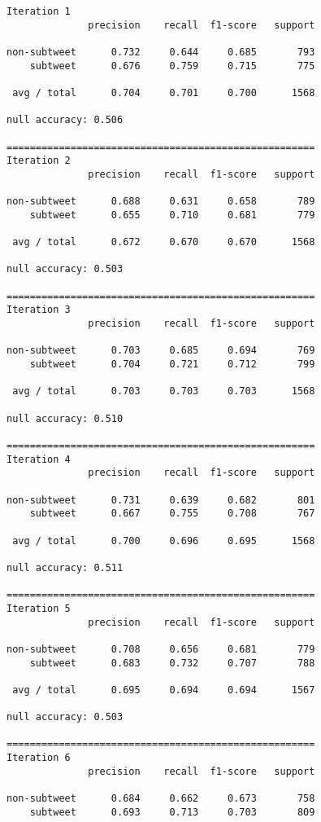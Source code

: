 \documentclass[11pt]{article}
\begin{document}
    \begin{Verbatim}[commandchars=\\\{\}]
Iteration 1
              precision    recall  f1-score   support

non-subtweet      0.732     0.644     0.685       793
    subtweet      0.676     0.759     0.715       775

 avg / total      0.704     0.701     0.700      1568

null accuracy: 0.506

=====================================================
Iteration 2
              precision    recall  f1-score   support

non-subtweet      0.688     0.631     0.658       789
    subtweet      0.655     0.710     0.681       779

 avg / total      0.672     0.670     0.670      1568

null accuracy: 0.503

=====================================================
Iteration 3
              precision    recall  f1-score   support

non-subtweet      0.703     0.685     0.694       769
    subtweet      0.704     0.721     0.712       799

 avg / total      0.703     0.703     0.703      1568

null accuracy: 0.510

=====================================================
Iteration 4
              precision    recall  f1-score   support

non-subtweet      0.731     0.639     0.682       801
    subtweet      0.667     0.755     0.708       767

 avg / total      0.700     0.696     0.695      1568

null accuracy: 0.511

=====================================================
Iteration 5
              precision    recall  f1-score   support

non-subtweet      0.708     0.656     0.681       779
    subtweet      0.683     0.732     0.707       788

 avg / total      0.695     0.694     0.694      1567

null accuracy: 0.503

=====================================================
Iteration 6
              precision    recall  f1-score   support

non-subtweet      0.684     0.662     0.673       758
    subtweet      0.693     0.713     0.703       809


\end{Verbatim}
\end{document}
